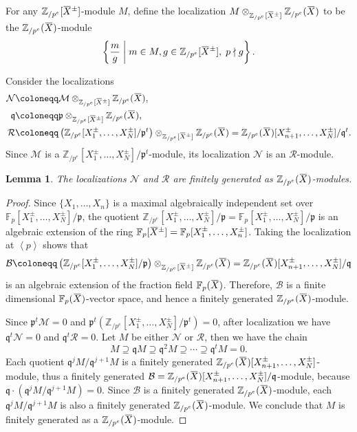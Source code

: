 \documentclass[letterpaper, 11pt, thm-restate]{article}
\numberwithin{equation}{section}
\newcommand{\F}{\mathbb{F}}
\newcommand{\Zpe}{\mathbb{Z}_{/p^e}}
\newcommand{\mM}{\mathcal{M}}
\newcommand{\mN}{\mathcal{N}}
\newcommand{\mB}{\mathcal{B}}
\newcommand{\mR}{\mathcal{R}}
\newcommand{\red}{\textcolor{red}}
\newcommand{\gen}[1]{\left\langle {#1} \right\rangle}
\newcommand{\oX}{\mkern 1.5mu\overline{\mkern-1.5mu X \mkern-1.5mu}\mkern 1.5mu}
\newcommand{\frp}{\mathfrak{p}}
\newcommand{\frq}{\mathfrak{q}}
\newtheorem{lem}[thrm]{Lemma}
\theoremstyle{definition}
\theoremstyle{definition}
\theoremstyle{definition}
\begin{document}
For any $\Zpe[\oX^{\pm}]$-module $M$, define the localization $M \otimes_{\Zpe[\oX^{\pm}]} \Zpe(\oX)$ to be the $\Zpe(\oX)$-module
\[
\left\{\frac{m}{g} \;\middle|\; m \in M, g \in \Zpe[\oX^{\pm}], \; p \nmid g \right\}.
\]

Consider the localizations
\begin{align*}
    \mN & \coloneqq \mM \otimes_{\Zpe[\oX^{\pm}]} \Zpe(\oX), \\
    \frq & \coloneqq \frp \otimes_{\Zpe[\oX^{\pm}]} \Zpe(\oX), \\
    \mR & \coloneqq \left(\Zpe[X_1^{\pm}, \ldots, X_N^{\pm}]/\frp^t \right) \otimes_{\Zpe[\oX^{\pm}]} \Zpe(\oX) = \Zpe(\oX)[X_{n+1}^{\pm}, \ldots, X_{N}^{\pm}]/\frq^t.
\end{align*}
Since $\mM$ is a $\Zpe[X_1^{\pm}, \ldots, X_N^{\pm}]/\frp^t$-module, its localization $\mN$ is an $\mR$-module.

\begin{lem}\label{lem:AYfgmod}
   The localizations $\mN$ and $\mR$ are finitely generated as $\Zpe(\oX)$-modules.
\end{lem}
\begin{proof}
    Since $\{X_1, \ldots, X_n\}$ is a maximal algebraically independent set over $\F_p[X_1^{\pm}, \ldots, X_N^{\pm}]/\frp$, the quotient $\Zpe[X_1^{\pm}, \ldots, X_N^{\pm}]/\frp = \F_p[X_1^{\pm}, \ldots, X_N^{\pm}]/\frp$ is an algebraic extension of the ring $\F_p[\oX^{\pm}] = \F_p[X_1^{\pm}, \ldots, X_n^{\pm}]$.
    Taking the localization at $\gen{p}$ shows that
    \[
    \mB \coloneqq \left(\Zpe[X_1^{\pm}, \ldots, X_N^{\pm}]/\frp\right) \otimes_{\Zpe[\oX^{\pm}]} \Zpe(\oX) = \Zpe(\oX)[X_{n+1}^{\pm}, \ldots, X_{N}^{\pm}]/\frq
    \]
    is an algebraic extension of the fraction field $\F_p(\oX)$.
    Therefore, $\mB$ is a finite dimensional $\F_p(\oX)$-vector space, and hence a finitely generated $\Zpe(\oX)$-module. %

    Since $\frp^t \mM = 0$ and $\frp^t \left(\Zpe[X_1^{\pm}, \ldots, X_N^{\pm}]/\frp^t \right) = 0$, after localization we have $\frq^t \mN = 0$ and $\frq^t \mR = 0$.
    Let $M$ be either $\mN$ or $\mR$, then we have the chain
    \[
    M \supseteq \frq M \supseteq \frq^2 M \supseteq \cdots \supseteq \frq^t M = 0.
    \]
    Each quotient $\frq^{j} M/\frq^{j+1} M$ is a finitely generated $\Zpe(\oX)[X_{n+1}^{\pm}, \ldots, X_{N}^{\pm}]$-module, thus a finitely generated $\mB = \Zpe(\oX)[X_{n+1}^{\pm}, \ldots, X_{N}^{\pm}]/\frq$-module, because $\frq \cdot (\frq^{j} M/\frq^{j+1} M) = 0$.
    Since $\mB$ is a finitely generated $\Zpe(\oX)$-module, each $\frq^{j} M/\frq^{j+1} M$ is also a finitely generated $\Zpe(\oX)$-module.
    We conclude that $M$ is finitely generated as a $\Zpe(\oX)$-module.
\end{proof}
\end{document}
